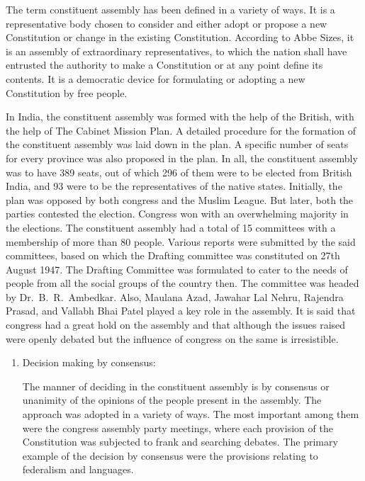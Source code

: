 \begin{multicols}{2}
\noi
The term constituent assembly has been defined in a variety of ways. It is a representative body chosen to consider and either adopt or propose a new Constitution or change in the existing Constitution. According to Abbe Sizes, it is an assembly of extraordinary representatives, to which the nation shall have entrusted the authority to make a Constitution or at any point define its contents. It is a democratic device for formulating or adopting a new Constitution by free people.

\noi
In India, the constituent assembly was formed with the help of the British, with the help of The Cabinet Mission Plan. A detailed procedure for the formation of the constituent assembly was laid down in the plan. A specific number of seats for every province was also proposed in the plan. In all, the constituent assembly was to have 389 seats, out of which 296 of them were to be elected from British India, and 93 were to be the representatives of the native states. Initially, the plan was opposed by both congress and the Muslim League. But later, both the parties contested the election. Congress won with an overwhelming majority in the elections. The constituent assembly had a total of 15 committees with a membership of more than 80 people. Various reports were submitted by the said committees, based on which the Drafting committee was constituted on 27th August 1947. The Drafting Committee was formulated to cater to the needs of people from all the social groups of the country then. The committee was headed by Dr.~B.~R.~Ambedkar. Also, Maulana Azad, Jawahar Lal Nehru, Rajendra Prasad, and Vallabh Bhai Patel played a key role in the assembly. It is said that congress had a great hold on the assembly and that although the issues raised were openly debated but the influence of congress on the same is irresistible.


\vspace{-.3cm}

\begin{enumerate}
\item Decision making by consensus:

\noi
The manner of deciding in the constituent assembly is by consensus or unanimity of the opinions of the people present in the assembly. The approach was adopted in a variety of ways. The most important among them were the congress assembly party meetings, where each provision of the Constitution was subjected to frank and searching debates. The primary example of the decision by consensus were the provisions relating to federalism and languages.


\end{enumerate}
\end{multicols}
